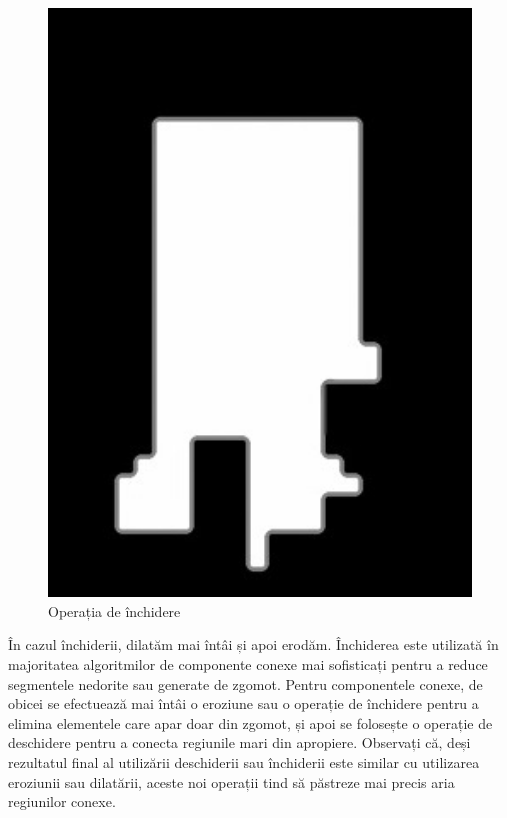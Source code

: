 \documentclass[a4paper,12pt]{report}
\begin{document}
\begin{figure}[h!]
\begin{minipage}{0.25\textwidth}
        \includegraphics[width=1\textwidth]{images/output_close.jpg}
        \caption{Operația de închidere}
    \end{minipage}
\end{figure}
\FloatBarrier

În cazul închiderii, dilatăm mai întâi și apoi erodăm. Închiderea este utilizată în majoritatea algoritmilor de componente conexe mai sofisticați pentru a reduce segmentele nedorite sau generate de zgomot. Pentru componentele conexe, de obicei se efectuează mai întâi o eroziune sau o operație de închidere pentru a elimina elementele care apar doar din zgomot, și apoi se folosește o operație de deschidere pentru a conecta regiunile mari din apropiere. Observați că, deși rezultatul final al utilizării deschiderii sau închiderii este similar cu utilizarea eroziunii sau dilatării, aceste noi operații tind să păstreze mai precis aria regiunilor conexe.
\end{document}
